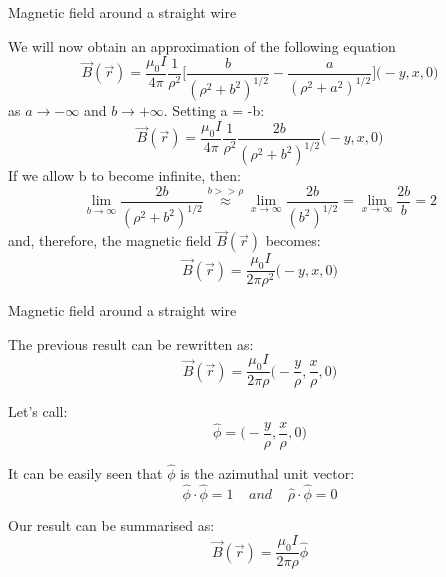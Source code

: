 %
%
%

\begin{frame}{Magnetic field around a straight wire}

We will now obtain an approximation of the following equation
\begin{equation*}
  \vec{B}(\vec{r}) = \frac{\mu_0I}{4\pi} \frac{1}{{\rho}^{2}}
    \Big[ \frac{b}{({\rho}^{2}+b^{2})^{1/2}} - \frac{a}{({\rho}^{2}+a^{2})^{1/2}}\Big] \Big( -y, x, 0 \Big)
\end{equation*}
as $a \rightarrow -\infty$ and $b \rightarrow +\infty$.
Setting a = -b:
\begin{equation*}
  \vec{B}(\vec{r}) = \frac{\mu_0I}{4\pi} \frac{1}{{\rho}^{2}} \frac{2b}{({\rho}^{2}+b^{2})^{1/2}} \Big( -y, x, 0 \Big)
\end{equation*}
If we allow b to become infinite, then:
\begin{equation*}
\displaystyle
  \lim_{b\to\infty} \frac{2b}{({\rho}^{2}+b^{2})^{1/2}}
     \stackrel{b >> {\rho}}{\approx} \lim_{x\to\infty} \frac{2b}{(b^{2})^{1/2}} =
     \lim_{x\to\infty} \frac{2b}{b} = 2
\end{equation*}
and, therefore, the magnetic field $\vec{B}(\vec{r})$ becomes:
\begin{equation*}
  \vec{B}(\vec{r}) = \frac{\mu_0I}{2\pi {\rho}^{2}} \Big( -y, x, 0 \Big)
\end{equation*}

\end{frame}

%
%
%

\begin{frame}{Magnetic field around a straight wire}

The previous result can be rewritten as:
\begin{equation*}
  \vec{B}(\vec{r}) = \frac{\mu_0I}{2\pi {\rho}} \Big( -\frac{y}{{\rho}}, \frac{x}{{\rho}}, 0 \Big)
\end{equation*}

Let's call:
\begin{equation*}
  \hat\phi =  \Big( -\frac{y}{{\rho}}, \frac{x}{{\rho}}, 0 \Big)
\end{equation*}

It can be easily seen that $\hat\phi$ is the azimuthal unit vector:
\begin{equation*}
  \hat\phi \cdot \hat\phi = 1 \;\;\;\; and \;\;\;\; \hat{\rho} \cdot \hat\phi = 0
\end{equation*}

Our result can be summarised as:
\begin{equation*}
  \vec{B}(\vec{r}) = \frac{\mu_0I}{2\pi {\rho}} \hat\phi
\end{equation*}

\end{frame}

